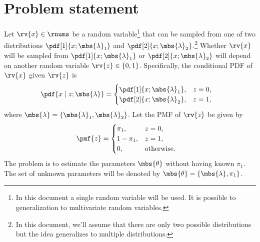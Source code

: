 \documentclass{tufte-handout}
\begin{document}
    \section{Problem statement}
    Let $\rv{x}\in\rnums$ be a random variable\footnote{In this document a single random variable will be used. It is possible to generalization to multivariate random variables.} that can be sampled from one of two distributions $\pdf[1]{x; \mbs{\lambda}_{1}}$ and $\pdf[2]{x; \mbs{\lambda}_{2}}$.\footnote{In this document, we'll assume that there are only two possible distributions but the idea generalizes to multiple distributions.}
    Whether $\rv{x}$ will be sampled from $\pdf[1]{x; \mbs{\lambda}_{1}}$ or $\pdf[2]{x; \mbs{\lambda}_{2}}$ will depend on another random variable $\rv{z}\in\left\{ 0, 1 \right\}$. Specifically, the conditional PDF of $\rv{x}$ given $\rv{z}$ is
    \begin{align}
        \label{eq:PDF x given z}
        \pdf{x\mid z; \mbs{\lambda} } &=
        \begin{cases}
            \pdf[1]{x; \mbs{\lambda}_{1}}, & z=0,\\
            \pdf[2]{x; \mbs{\lambda}_{2}}, & z=1,
        \end{cases}
    \end{align}
    where $\mbs{\lambda} = \{\mbs{\lambda}_{1}, \mbs{\lambda}_{2}\}$. Let the PMF of $\rv{z}$ be given by
    \begin{align}
        \label{eq:PMF z}
        \pmf{z} &= 
        \begin{cases}
            \pi_{1}, & z=0,\\
            1-\pi_{1}, & z=1,\\
            0, & \text{otherwise}.
        \end{cases}
    \end{align}
    The problem is to estimate the parameters $\mbs{\theta}$ without having known $\pi_{1}$. The set of unknown parameters will be denoted by $\mbs{\theta} = \left\{ \mbs{\lambda}, \pi_{1} \right\}$. 
\end{document}
